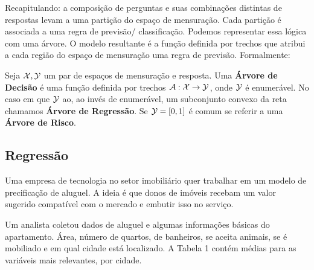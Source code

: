 Recapitulando: a composição de perguntas e suas combinações distintas de respostas levam a uma partição do espaço de mensuração. Cada partição é associada a uma regra de previsão/ classificação. Podemos representar essa lógica com uma árvore. O modelo resultante é a função definida por trechos que atribui a cada região do espaço de mensuração uma regra de previsão. Formalmente:


\begin{defi}
Seja $\mathcal{X}, \mathcal{Y}$ um par de espaços de mensuração e resposta. Uma \textbf{Árvore de Decisão} é uma função definida por trechos $\mathcal{A}: \mathcal{X} \to \mathcal{Y}$, onde $\mathcal{Y}$ é enumerável. No caso em que $\mathcal{Y}$ ao, ao invés de enumerável, um subconjunto convexo da reta chamamos \textbf{Árvore de Regressão}. Se $\mathcal{Y} = [0, 1]$ é comum se referir a uma \textbf{Árvore de Risco}.
\end{defi}


\subsection{Regressão}

Uma empresa de tecnologia no setor imobiliário quer trabalhar em um modelo de precificação de aluguel. A ideia é que donos de imóveis recebam um valor sugerido compatível com o mercado e embutir isso no serviço.
 
 Um analista coletou dados de aluguel e algumas informações básicas do apartamento. Área, número de quartos, de banheiros, se aceita animais, se é mobiliado e em qual cidade está localizado. A Tabela 1 contém médias para as variáveis mais relevantes, por cidade.
 
 



 
\begin{figure}[H]
    \centering
        \label{fig:arvore_reg}
\end{figure}

